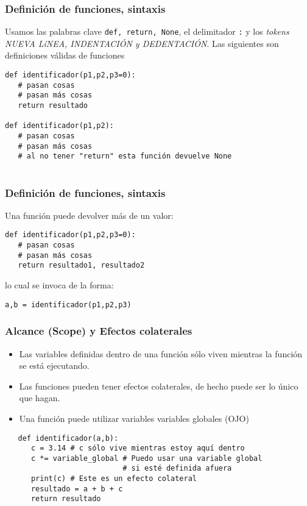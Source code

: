 \documentclass{beamer}
\begin{document}
\begin{frame}[fragile]
\frametitle{Definición de funciones, sintaxis}
Usamos las palabras clave \texttt{def, return, None}, el delimitador \texttt{:} y los {\em tokens NUEVA LíNEA, INDENTACIÓN y DEDENTACIÓN}. Las siguientes son definiciones válidas de funciones
\begin{block}{}
\begin{verbatim}
def identificador(p1,p2,p3=0):
   # pasan cosas
   # pasan más cosas
   return resultado 
 
def identificador(p1,p2):
   # pasan cosas
   # pasan más cosas
   # al no tener "return" esta función devuelve None
   
\end{verbatim}
\end{block}
\end{frame}

\begin{frame}[fragile]
\frametitle{Definición de funciones, sintaxis}
Una función puede devolver más de un valor:
\begin{block}{}
\begin{verbatim}
def identificador(p1,p2,p3=0):
   # pasan cosas
   # pasan más cosas
   return resultado1, resultado2    
\end{verbatim}
lo cual se invoca de la forma:
\begin{verbatim}
a,b = identificador(p1,p2,p3)
\end{verbatim}
\end{block}
\end{frame}

\begin{frame}[fragile]
   \frametitle{Alcance (Scope) y Efectos colaterales}
   \begin{itemize}
      \item Las variables definidas dentro de una función sólo viven mientras la función se está ejecutando.
      \item Las funciones pueden tener efectos colaterales, de hecho puede ser lo único que hagan.
      \item Una función puede utilizar variables variables globales \alert{(OJO)}
   \end{itemize}
    
   \begin{block}{}
   \begin{verbatim}
   def identificador(a,b):
      c = 3.14 # c sólo vive mientras estoy aquí dentro
      c *= variable_global # Puedo usar una variable global
                           # si esté definida afuera
      print(c) # Este es un efecto colateral 
      resultado = a + b + c
      return resultado 
   \end{verbatim}
   \end{block}
   \end{frame}
\end{document}
